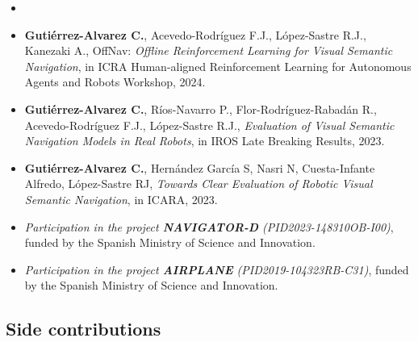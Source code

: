\begin{itemize}
    \item {}
    \item \textbf{Gutiérrez-Alvarez C.}, Acevedo-Rodríguez F.J., López-Sastre R.J., Kanezaki A., OffNav: \textit{Offline Reinforcement Learning for Visual Semantic Navigation}, in ICRA Human-aligned Reinforcement Learning for Autonomous Agents and Robots Workshop, 2024.
    \item \textbf{Gutiérrez-Alvarez C.}, Ríos-Navarro P., Flor-Rodríguez-Rabadán R., Acevedo-Rodríguez F.J., López-Sastre R.J., \textit{Evaluation of Visual Semantic Navigation Models in Real Robots}, in IROS Late Breaking Results, 2023.
    \item \textbf{Gutiérrez-Alvarez C.}, Hernández García S, Nasri N, Cuesta-Infante Alfredo, López-Sastre RJ, \textit{Towards Clear Evaluation of Robotic Visual Semantic Navigation}, in ICARA, 2023.
    \item \textit{Participation in the project \textbf{NAVIGATOR-D} (PID2023-148310OB-I00)}, funded by the Spanish Ministry of Science and Innovation.
    \item \textit{Participation in the project \textbf{AIRPLANE} (PID2019-104323RB-C31)}, funded by the Spanish Ministry of Science and Innovation.
\end{itemize}

\subsection{Side contributions}\label{subsec:side-contributions}

